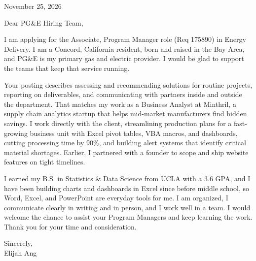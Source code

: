 \documentclass[11pt,letterpaper]{article}
\begin{document}


\vspace{12pt}

November 25, 2026

Dear PG\&E Hiring Team,

I am applying for the Associate, Program Manager role (Req 175890) in Energy Delivery. I am a Concord, California resident, born and raised in the Bay Area, and PG\&E is my primary gas and electric provider. I would be glad to support the teams that keep that service running.

Your posting describes assessing and recommending solutions for routine projects, reporting on deliverables, and communicating with partners inside and outside the department. That matches my work as a Business Analyst at Minthril, a supply chain analytics startup that helps mid-market manufacturers find hidden savings. I work directly with the client, streamlining production plans for a fast-growing business unit with Excel pivot tables, VBA macros, and dashboards, cutting processing time by 90\%, and building alert systems that identify critical material shortages. Earlier, I partnered with a founder to scope and ship website features on tight timelines.

I earned my B.S. in Statistics \& Data Science from UCLA with a 3.6 GPA, and I have been building charts and dashboards in Excel since before middle school, so Word, Excel, and PowerPoint are everyday tools for me. I am organized, I communicate clearly in writing and in person, and I work well in a team. I would welcome the chance to assist your Program Managers and keep learning the work. Thank you for your time and consideration.

Sincerely,\\
Elijah Ang
\end{document}
